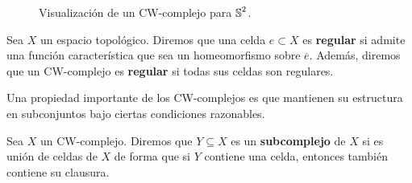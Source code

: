 \begin{figure}[h!]
	\centering
	\caption{Visualización de un CW-complejo para $\operatorname{\mathbb{S}}^{2}$.}
\end{figure}

\begin{definicion}
	Sea $X$ un espacio topológico. Diremos que una celda $e \subset X$ es \textbf{regular}
	si admite una función característica que sea un homeomorfismo sobre $\overline{e}$.
	Además, diremos que un CW-complejo es \textbf{regular} si todas sus celdas son
	regulares.
\end{definicion}

Una propiedad importante de los CW-complejos es que mantienen su estructura en
subconjuntos bajo ciertas condiciones razonables.

\begin{definicion}
	Sea $X$ un CW-complejo. Diremos que $Y \subseteq X$ es un \textbf{subcomplejo}
	de $X$ si es unión de celdas de $X$ de forma que si $Y$ contiene una celda,
	entonces también contiene su clausura.
\end{definicion}

